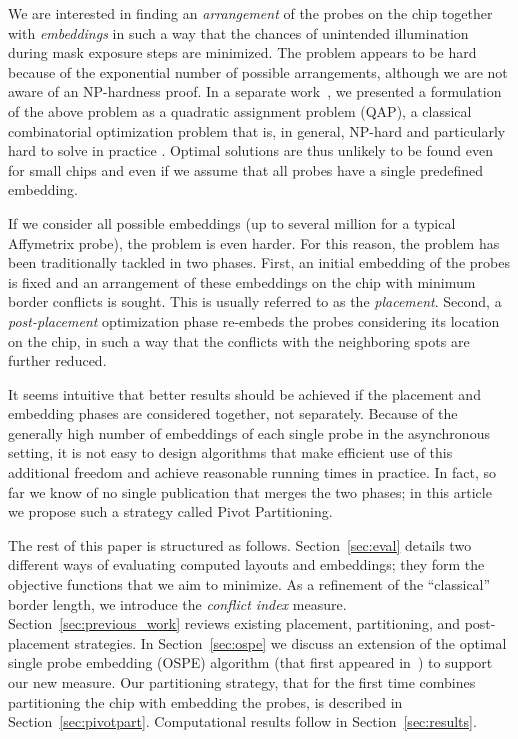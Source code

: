 \documentclass{llncs}
\begin{document}
We are interested in finding an \emph{arrangement} of the probes on the chip
together with \emph{embeddings} in such a way that the chances of unintended
illumination during mask exposure steps are minimized. The problem appears to
be hard because of the exponential number of possible arrangements, although
we are not aware of an NP-hardness proof.  In a separate
work~\cite{CARVALHO06}, we presented a formulation of the above problem as a
quadratic assignment problem (QAP), a classical combinatorial optimization
problem that is, in general, NP-hard and particularly hard to solve in
practice \cite{CELA98}. Optimal solutions are thus unlikely to be found even
for small chips and even if we assume that all probes have a single predefined
embedding.

If we consider all possible embeddings (up to several million for a
typical Affymetrix probe), the problem is even harder.
For this reason, the problem has been traditionally tackled in two phases.
First, an initial embedding of the probes is fixed and an arrangement of these
embeddings on the chip with minimum border conflicts is sought. This is
usually referred to as the \emph{placement}. Second, a \emph{post-placement}
optimization phase re-embeds the probes considering its location on the chip,
in such a way that the conflicts with the neighboring spots are further
reduced.

It seems intuitive that better results should be achieved if the placement and
embedding phases are considered together, not separately. Because of the
generally high number of embeddings of each single probe in the asynchronous
setting, it is not easy to design algorithms that make efficient use of this
additional freedom and achieve reasonable running times in practice. In fact,
so far we know of no single publication that merges the two phases; in this
article we propose such a strategy called Pivot Partitioning.

The rest of this paper is structured as follows. Section~\ref{sec:eval}
details two different ways of evaluating computed layouts and embeddings; they
form the objective functions that we aim to minimize. As a refinement of the
``classical'' border length, we introduce the
\emph{conflict index} measure. Section~\ref{sec:previous_work} reviews
existing placement, partitioning, and post-placement strategies.  In
Section~\ref{sec:ospe} we discuss an extension of the optimal single probe
embedding (OSPE) algorithm (that first appeared in~\cite{KAHNG02}) to support
our new measure. Our
partitioning strategy, that for the first time combines partitioning the chip
with embedding the probes, is described in Section~\ref{sec:pivotpart}.
Computational results follow in Section~\ref{sec:results}.
\end{document}
